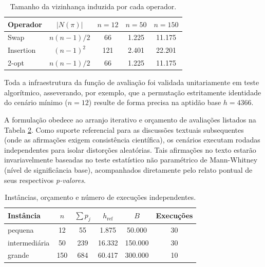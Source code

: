 \begin{table}[H]
\centering
\caption{Tamanho da vizinhança induzida por cada operador.}
\label{tab:tamanho-vizinhancas}
\begin{tabular}{lcccc}
\toprule
Operador  & $|N(\pi)|$ & $n=12$ & $n=50$ & $n=150$ \\
\midrule
Swap      & $n(n-1)/2$ & 66 & 1.225 & 11.175 \\
Insertion & $(n-1)^2$ & 121 & 2.401 & 22.201 \\
2-opt     & $n(n-1)/2$ & 66 & 1.225 & 11.175 \\
\bottomrule
\end{tabular}
\end{table}

Toda a infraestrutura da função de avaliação foi validada unitariamente em teste algorítmico, asseverando, por exemplo, que a permutação estritamente identidade do cenário mínimo ($n=12$) resulte de forma precisa na aptidão base $h = 4366$.

A formulação obedece ao arranjo iterativo e orçamento de avaliações listados na Tabela \ref{tab:instancias}. Como suporte referencial para as discussões textuais subsequentes (onde as afirmações exigem consistência científica), os cenários executam rodadas independentes para isolar distorções aleatórias. Tais afirmações no texto estarão invariavelmente baseadas no teste estatístico não paramétrico de Mann-Whitney (nível de significância base), acompanhados diretamente pelo relato pontual de seus respectivos \textit{p-valores}.

\begin{table}[H]
\centering
\caption{Instâncias, orçamento e número de execuções independentes.}
\label{tab:instancias}
\begin{tabular}{lccccc}
\toprule
Instância     & $n$ & $\sum p_j$ & $h_{\text{ref}}$ & $B$ & Execuções \\
\midrule
pequena       & 12  & 55         & 1.875            & 50.000  & 30        \\
intermediária & 50  & 239        & 16.332           & 150.000 & 30        \\
grande        & 150 & 684        & 60.417           & 300.000 & 10        \\
\bottomrule
\end{tabular}
\end{table}
